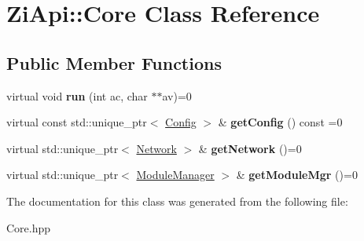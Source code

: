 \hypertarget{classZiApi_1_1Core}{}\section{Zi\+Api\+::Core Class Reference}
\label{classZiApi_1_1Core}
\subsection*{Public Member Functions}
\begin{DoxyCompactItemize}
\item 
\mbox{\label{classZiApi_1_1Core_afa47f4a4077e0669330daf82538b2240}} 
virtual void {\bfseries run} (int ac, char $\ast$$\ast$av)=0
\item 
\mbox{\label{classZiApi_1_1Core_a413a22c6b6db34ae2d92bf780578938c}} 
virtual const std\+::unique\+\_\+ptr$<$ \mbox{\hyperlink{classZiApi_1_1Config}{Config}} $>$ \& {\bfseries get\+Config} () const =0
\item 
\mbox{\label{classZiApi_1_1Core_aa5c7afdd2b54e12df4d4394dcd26a1e8}} 
virtual std\+::unique\+\_\+ptr$<$ \mbox{\hyperlink{classZiApi_1_1Network}{Network}} $>$ \& {\bfseries get\+Network} ()=0
\item 
\mbox{\label{classZiApi_1_1Core_a902b29075c127a656d27505ff9c58cb6}} 
virtual std\+::unique\+\_\+ptr$<$ \mbox{\hyperlink{classZiApi_1_1ModuleManager}{Module\+Manager}} $>$ \& {\bfseries get\+Module\+Mgr} ()=0
\end{DoxyCompactItemize}


The documentation for this class was generated from the following file\+:\begin{DoxyCompactItemize}
\item 
Core.\+hpp\end{DoxyCompactItemize}
